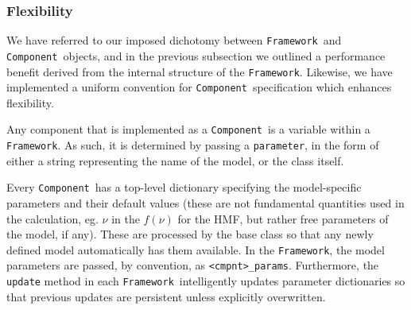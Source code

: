 \documentclass[5p,aas_macros]{elsarticle}
\newcommand{\framework}{\texttt{Framework}\xspace} %
\newcommand{\component}{\texttt{Component}\xspace} %
\newcommand{\parameter}{\texttt{parameter}\xspace} %
\begin{document}




\subsubsection{Flexibility}
\label{sec:halomod:overview:flexibility}
We have referred to our imposed dichotomy between \framework\ and \component\ objects, and in the previous subsection we outlined a performance benefit derived from the internal structure of the \framework. Likewise, we have implemented a uniform convention for \component\ specification which enhances flexibility.

Any component that is implemented as a \component\ is a variable within a \framework. As such, it is determined by passing a \parameter, in the form of either a string representing the name of the model, or the class itself. 

Every \component\ has a top-level dictionary specifying the model-specific parameters and their default values (these are not fundamental quantities used in the calculation, eg. $\nu$ in the $f(\nu)$ for the HMF, but rather free parameters of the model, if any). These are processed by the base class so that any newly defined model automatically has them available. In the \framework, the model parameters are passed, by convention, as \verb|<cmpnt>_params|. Furthermore, the \verb|update| method in each \framework\ intelligently updates parameter dictionaries so that previous updates are persistent unless explicitly overwritten.
\end{document}
